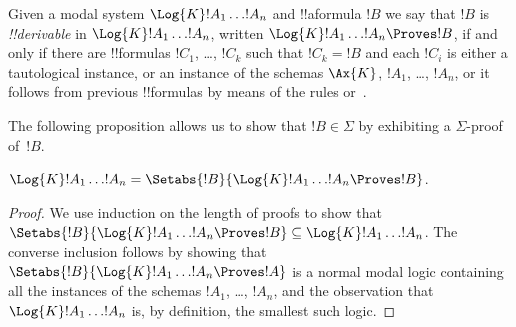 \documentclass[../../../include/open-logic-section]{subfiles}
\begin{document}


\begin{defn}
  Given a modal system $\Log{K} !A_1 \dots !A_n$
  and !!a{formula} $!B$ we say that $!B$ is \emph{!!{derivable}} in
  $\Log{K} !A_1 \dots !A_n$, written $\Log{K}
  !A_1 \dots !A_n \Proves !B$, if and only if
  there are !!{formula}s $!C_1$, \dots, $!C_k$ such that $!C_k
  = !B$ and each $!C_i$ is either a tautological instance,
  or an instance of the schemas $\Ax{K}$, $!A_1$, \dots,
  $!A_n$, or it follows from previous !!{formula}s by means of the
  rules \MP{} or~\Nec.
\end{defn}

The following proposition allows us to show that $!B \in \Sigma$
by exhibiting a $\Sigma$-proof of~$!B$.

\begin{prop}
  $\Log{K} !A_1 \dots !A_n = \Setabs{!B}{\Log{K} !A_1 \dots !A_n \Proves !B}$.
\end{prop}

\begin{proof}
  We use induction on the length of proofs to show that
  $\Setabs{!B}{\Log{K} !A_1 \dots !A_n \Proves !B} \subseteq \Log{K}
  !A_1 \dots !A_n$. The converse inclusion follows by showing that
  $\Setabs{!B}{\Log{K} !A_1 \dots !A_n \Proves !A }$ is a normal
  modal logic containing all the instances of the schemas $!A_1$,
  \dots, $!A_n$, and the observation that $\Log{K} !A_1 \dots !A_n$
  is, by definition, the smallest such logic.
\end{proof}
\end{document}
